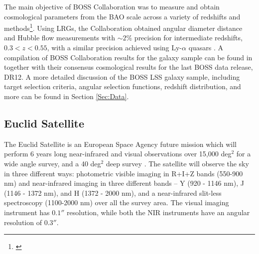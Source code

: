 \qquad The main objective of BOSS Collaboration was to measure and obtain cosmological parameters from the BAO scale across a variety of redshifts and methods\footnote{\cite{2017RossBOSS,2017BeutlerBOSS,2017Beutler2BOSS,2017SatpathyBOSS,2017SanchezBOSS,2017GriebBOSS,2017SalazarBOSSwTheta,2017WangBOSS,2017ZhaoBOSS}}. Using LRGs, the Collaboration obtained angular diameter distance and Hubble flow measurements with $\sim 2\%$ precision for intermediate redshifts, $0.3 < z < 0.55$, with a similar precision achieved using Ly-$\alpha$ quasars \citep{2013LyAlphaBOSS,2017QuasarsBOSS}. A compilation of BOSS Collaboration results for the galaxy sample can be found in \cite{2016BOSSCosmology} together with their consensus cosmological results for the last BOSS data release, DR12. A more detailed discussion of the BOSS LSS galaxy sample, including target selection criteria, angular selection functions, redshift distribution, and more can be found in Section \ref{Sec:Data}.



\subsection{Euclid Satellite}
The Euclid Satellite is an European Space Agency future mission which will perform 6 years long near-infrared and visual observations over 15,000 deg$^2$ for a wide angle survey, and a 40 deg$^2$ deep survey \citep{2011EuclidRedPaper}. The satellite will observe the sky in three different ways: photometric visible imaging in R+I+Z bands (550-900 nm) and near-infrared imaging in three different bands -- Y (920 - 1146 nm), J (1146 - 1372 nm), and H (1372 - 2000 nm), and a near-infrared slit-less spectroscopy (1100-2000 nm) over all the survey area. The visual imaging instrument has $0.1 ''$ resolution, while both the NIR instruments have an angular resolution of $0.3''$.

